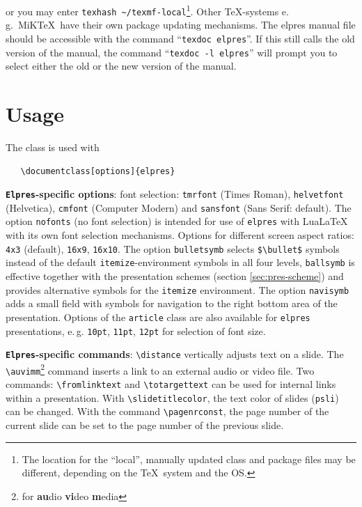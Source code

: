 \documentclass[11pt,a4paper]{article}
\begin{document}
or you may enter \verb+texhash ~/texmf-local+\footnote{The location
  for the ``local'', manually updated class and package files may be different,
  depending on the \TeX\ system and the OS.}.
Other \TeX-systems e.\,g.\ MiK\TeX\ have
their own package updating mechanisms. The elpres manual file should be
accessible with the command ``\mbox{\texttt{texdoc elpres}}''. If this
still calls the old version of the manual, the command ``\texttt{texdoc -l elpres}''
will prompt you to select either the old or the new version of the manual.

\section{Usage}

\label{secUsage}

The class is used with 
\begin{verbatim}
   \documentclass[options]{elpres}
\end{verbatim}

\textbf{\texttt{Elpres}-specific options}: font selection:
 \texttt{tmrfont} (Times Roman), \texttt{helvetfont}
(Helvetica), \texttt{cmfont} (Computer Modern) and \texttt{sansfont} (Sans
Serif: default). The option \texttt{nofonts} (no font selection) 
is intended for use of \texttt{elpres} with Lua\LaTeX\
with its own font selection mechanisms.
Options for different screen aspect ratios: \texttt{4x3}
(default), \texttt{16x9}, \texttt{16x10}. 
The option \texttt{bulletsymb} selects \verb+$\bullet$+ symbols
instead of the default \texttt{itemize}-environment
symbols in all four levels,
\texttt{ballsymb} is effective together with the presentation
schemes (section \ref{sec:pres-scheme})
and provides alternative symbols for the \texttt{itemize} environment. 
%
The option \texttt{navisymb}
adds a small field with symbols for navigation to the right
bottom area of the presentation. 
Options of the \texttt{article} class are also available for
\texttt{elpres} presentations,
e.\,g.  \texttt{10pt}, \texttt{11pt}, \texttt{12pt} for
selection of font size. 


\textbf{\texttt{Elpres}-specific commands}:
\verb+\distance+ vertically adjusts  text on a slide.
The \verb+\auvimm+\footnote{for \textbf{au}dio \textbf{vi}deo \textbf{m}edia}
command inserts a link to an external audio or video file.
Two commands: \verb+\fromlinktext+ and \verb+\totargettext+
can be used for internal links within a presentation.
With \verb+\slidetitlecolor+, the text color of slides (\texttt{psli})
can be changed.
With the command \verb+\pagenrconst+, the page number of
the current slide can be set to the page number of the previous slide.
\end{document}
